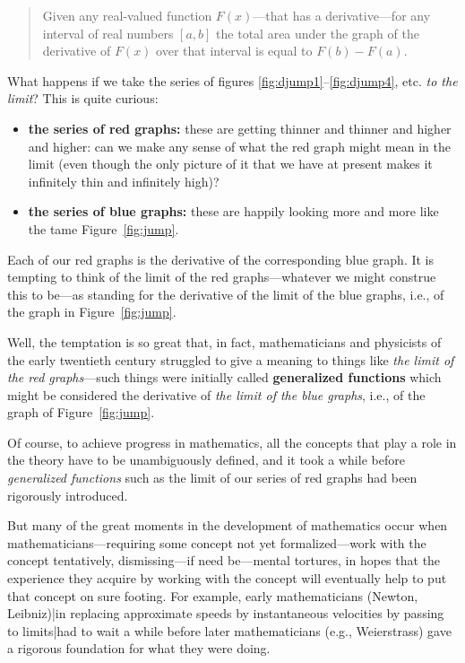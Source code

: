 \documentclass[openany]{book}
\theoremstyle{plain}
\theoremstyle{definition}
\begin{document}
{{\begin{quote} Given any real-valued function $F(x)$---that has a
  derivative---for any interval of real numbers $[a,b]$ the total area
  under the graph of the derivative of $F(x)$ over that interval is
  equal to $F(b)-F(a)$.
  \end{quote}
    What happens if we take the series of figures \ref{fig:djump1}--\ref{fig:djump4}, etc.
    {\it to the limit}?  This is quite curious:

  \begin{itemize}
  \item {\bf the series of red graphs:} these are getting thinner and
    thinner and higher and higher: can we make any sense of what the
    red graph might mean in the limit (even though the only picture of
    it that we have at present makes it infinitely thin and infinitely
    high)?

  \item {\bf the series of blue graphs:} these are happily looking
    more and more like the tame Figure~\ref{fig:jump}.
   \end{itemize}

   Each of our red graphs is the derivative of the corresponding blue
   graph. It is tempting to think of the limit of the red
   graphs---whatever we might construe this to be---as standing for
   the derivative of the limit of the blue graphs, i.e., of the graph
   in Figure~\ref{fig:jump}.

   Well, the temptation is so great that, in fact, mathematicians and
   physicists of the early twentieth century struggled to give a
   meaning to things like {\it the limit of the red graphs}---such
   things were initially called {\bf generalized functions} which
   might be considered the derivative of {\it the limit of the blue
     graphs}, i.e., of the graph of Figure~\ref{fig:jump}.


   Of course, to achieve progress in mathematics, all the concepts
   that play a role in the theory have to be unambiguously defined,
   and it took a while before {\it generalized functions} such as the
   limit of our series of red graphs had been rigorously introduced.

   But many of the great moments in the development of mathematics
   occur when mathematicians---requiring some concept not yet
   formalized---work with the concept tentatively, dismissing---if
   need be---mental tortures, in hopes that the experience they
   acquire by working with the concept will eventually help to put
   that concept on sure footing. For example, early mathematicians
   (Newton, Leibniz)|in replacing approximate speeds by instantaneous
   velocities by passing to limits|had to wait a while before later
   mathematicians (e.g., Weierstrass) gave a rigorous foundation for
   what they were doing.


}}
\end{document}
